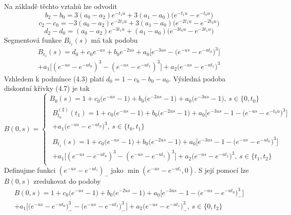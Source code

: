 \documentclass[a4paper]{book}
\begin{document}
Na základě těchto vztahů lze odvodit
\begin{equation*}
b_2 - b_0 = 3(a_0 - a_2)e^{-t_1u} + 3(a_1 - a_0)\Big( e^{-t_1u} - e^{-t_0u} \Big)
\end{equation*}
\begin{equation*}
c_2 - c_0 = -3(a_0 - a_2)e^{-2t_1u} + 3(a_1 - a_0)\Big( e^{-2t_1u} - e^{-2t_0u} \Big)
\end{equation*}
\begin{equation*}
d_2 - d_0 = (a_0 - a_2)e^{-3t_1u} + (a_1 - a_0)\Big( e^{-3t_0u} - e^{-3t_1u} \Big)
\end{equation*}
Segmentová funkce $B_{t_1}(s)$ má tak podobu
\begin{equation*}
\begin{split}
B_{t_1}(s) = d_0 + c_0e^{-us} + b_0e^{-2us} + a_0 \Big[ e^{-3us} - \Big( e^{-us} - e^{-ut_0} \Big)^3 \Big] \\
+ a_1 \Big[ (e^{-us} - e^{-ut_0})^3 - (e^{-us} - e^{-ut_1})^3 \Big] + a_2 \Big( e^{-us} - e^{-ut_1} \Big)^3
\end{split}
\end{equation*}
Vzhledem k podmínce (4.3) platí $d_0 = 1 - c_0 - b_0 - a_0$. Výsledná podoba diskontní křivky (4.7) je tak
\begin{equation*}
B(0,s) = 
\begin{cases}
B_0(s) = 1 + c_0\Big(e^{-us} - 1 \Big) + b_0 \Big(e^{-2us} - 1 \Big) + a_0 \Big(e^{-3us} - 1 \Big), ~ s \in \{0,t_0\}\\
\begin{split}
B_{t_0}^{(2)}(t_1) = 1 + c_0 \Big( e^{-us} - 1 \Big) + b_0 \Big(e^{-2us} - 1 \Big) + a_0\Big[e^{-3us} - 1 - \Big(e^{-us} - e^{-t_0u} \Big)^3 \Big]\\ + a_1\Big( e^{-us} - e^{-ut_0} \Big)^3, ~ s \in \{t_0,t_1\}
\end{split}
\\
\begin{split}
B_{t_1}(s) = 1 + c_0 \Big(e^{-us} - 1 \Big) + b_0 \Big( e^{-2us} - 1 \Big) + a_0 \Big[ e^{-3us} - 1 - \Big( e^{-us} - e^{-ut_0} \Big)^3  \Big]\\
+ a_1 \Big[ (e^{-us} - e^{-ut_0})^3 - (e^{-us} - e^{-ut_1})^3 \Big] + a_2 \Big( e^{-us} - e^{-ut_1} \Big)^3, ~ s \in \{t_1,t_2\}
\end{split}
\end{cases}
\end{equation*}
Definujme funkci $(e^{-us} - e^{-ut_i})_{-}$ jako $\min(e^{-us} - e^{-ut_i}, 0)$. S její pomocí lze  $B(0,s)$ zredukovat do podoby
\begin{equation}
\begin{split}
B(0,s) = 1 + c_0 \Big( e^{-us} - 1 \Big) + b_0 \Big( e^{-2us} - 1 \Big) + a_0 \Big[ e^{-3us} - 1 - \Big( e^{-us} - e^{-ut_0} \Big)_{-}^3 \Big]\\
+ a_1 \Big[ \Big(e^{-us} - e^{-ut_0} \Big)_{-}^3 - \Big(e^{-us} - e^{-ut_1} \Big)_{-}^3\Big] + a_2 \Big(e^{-us} - e^{-ut_1} \Big)_{-}^3, ~ s \in \{0, t_2 \}
\end{split}
\end{equation}
\end{document}
